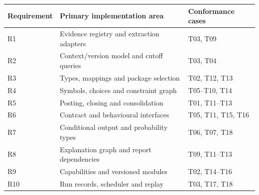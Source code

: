 \begin{center}
\begin{tabular}{lll}
\toprule Requirement & Primary implementation area & Conformance cases\\\midrule
R1 & Evidence registry and extraction adapters & T03, T09\\
R2 & Context/version model and cutoff queries & T03, T04\\
R3 & Types, mappings and package selection & T02, T12, T13\\
R4 & Symbols, choices and constraint graph & T05--T10, T14\\
R5 & Posting, closing and consolidation & T01, T11--T13\\
R6 & Contract and behavioural interfaces & T05, T11, T15, T16\\
R7 & Conditional output and probability types & T06, T07, T18\\
R8 & Explanation graph and report dependencies & T09, T11--T13\\
R9 & Capabilities and versioned modules & T02, T14--T16\\
R10 & Run records, scheduler and replay & T03, T17, T18\\\bottomrule
\end{tabular}
\end{center}
